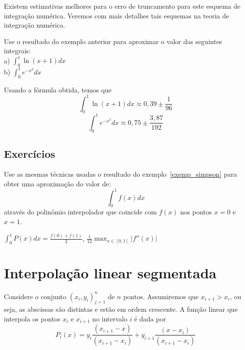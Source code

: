 \begin{obs}Existem estimativas melhores para o erro de truncamento para este esquema de integração numérica. Veremos com mais detalhes tais esquemas na teoria de integração numérica.
\end{obs}

\begin{ex}
Use o resultado do exemplo anterior para aproximar o valor das seguintes integrais:\\

a) $\displaystyle \int_0^1 \ln(x+1) dx$\\

b) $\displaystyle \int_0^1 e^{-x^2}dx$

\end{ex}
\begin{sol}
Usando a fórmula obtida, temos que
$$
\int_0^1\ln(x+1) dx \approx 0,39\pm \frac{1}{96}
$$
$$
\int_0^1 e^{-x^2} dx \approx 0,75\pm \frac{3,87}{192}
$$  
\end{sol}

\subsection*{Exercícios}

\begin{exer}
  Use as mesmas técnicas usadas o resultado do exemplo~\ref{exemp_simpson} para obter uma aproximação do valor de:
  \begin{equation*}
    \int_0^1 f(x)dx
  \end{equation*}
através do polinômio interpolador que coincide com $f(x)$ nos pontos $x=0$ e $x=1$.
\end{exer}
\begin{resp}
  
  $\int_0^1 P(x)dx =\frac{f(0)+f(1)}{2}$, $\frac{1}{12}\max_{x\in[0,1]}|f''(x)|$  
  
\end{resp}

\section{Interpolação linear segmentada}
Considere o conjunto $\left(x_i,y_i\right)_{j=1}^n$ de $n$ pontos. Assumiremos que $x_{i+1}>x_i$, ou seja, as abscissas são distintas e estão em ordem crescente. A função linear que interpola os pontos $x_i$ e $x_{i+1}$ no intervalo $i$ é dada por
$$P_i(x)=y_i \frac{(x_{i+1}-x)}{(x_{i+1}-x_i)} + y_{i+1} \frac{(x-x_i)}{(x_{i+1}-x_i)}$$

